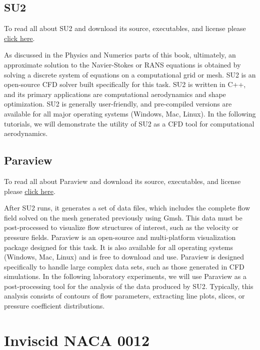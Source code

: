 \section*{SU2}
\begin{su2note}
	To read all about SU2 and download its source, executables, and license please \href{https://su2code.github.io/}{\underline{click here}}.
\end{su2note}
As discussed in the Physics and Numerics parts of this book, ultimately, an approximate solution to the Navier-Stokes or RANS equations is obtained by solving a discrete system of equations on a computational grid or mesh. SU2 is an open-source CFD solver built specifically for this task. SU2 is written in C++, and its primary applications are computational aerodynamics and shape optimization. SU2 is generally user-friendly, and pre-compiled versions are available for all major operating systems (Windows, Mac, Linux). In the following tutorials, we will demonstrate the utility of SU2 as a CFD tool for computational aerodynamics.

\section*{Paraview}
\begin{paraviewnote}
	To read all about Paraview and download its source, executables, and license please \href{https://www.paraview.org/}{\underline{click here}}.
\end{paraviewnote}
After SU2 runs, it generates a set of data files, which includes the complete flow field solved on the mesh generated previously using Gmsh. This data must be post-processed to visualize flow structures of interest, such as the velocity or pressure fields. Paraview is an open-source and multi-platform visualization package designed for this task. It is also available for all operating systems (Windows, Mac, Linux) and is free to download and use. Paraview is designed specifically to handle large complex data sets, such as those generated in CFD simulations. In the following laboratory experiments, we will use Paraview as a post-processing tool for the analysis of the data produced by SU2. Typically, this analysis consists of contours of flow parameters, extracting line plots, slices, or pressure coefficient distributions.

 \chapter{Inviscid NACA 0012}
\label{ch:Inviscid NACA 0012}
